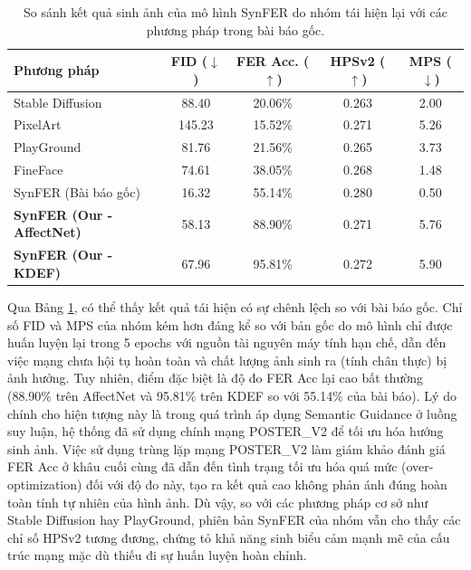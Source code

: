 \begin{table}[htbp]
    \caption{So sánh kết quả sinh ảnh của mô hình SynFER do nhóm tái hiện lại với các phương pháp trong bài báo gốc.}
    \label{tab:exp_results}
    \centering
    \begin{tabular}{lcccc}
        \toprule
        \textbf{Phương pháp}              & \textbf{FID} ($\downarrow$) & \textbf{FER Acc.} ($\uparrow$) & \textbf{HPSv2} ($\uparrow$) & \textbf{MPS} ($\downarrow$) \\
        \midrule
        Stable Diffusion                  & 88.40                       & 20.06\%                        & 0.263                       & 2.00                        \\
        PixelArt                          & 145.23                      & 15.52\%                        & 0.271                       & 5.26                        \\
        PlayGround                        & 81.76                       & 21.56\%                        & 0.265                       & 3.73                        \\
        FineFace                          & 74.61                       & 38.05\%                        & 0.268                       & 1.48                        \\
        SynFER (Bài báo gốc)              & 16.32                       & 55.14\%                        & 0.280                       & 0.50                        \\
        \midrule
        \textbf{SynFER (Our - AffectNet)} & 58.13                       & 88.90\%                        & 0.271                       & 5.76                        \\
        \textbf{SynFER (Our - KDEF)}      & 67.96                       & 95.81\%                        & 0.272                       & 5.90                        \\
        \bottomrule
    \end{tabular}
\end{table}

Qua Bảng \ref{tab:exp_results}, có thể thấy kết quả tái hiện có sự chênh lệch so với bài báo gốc. Chỉ số FID và MPS của nhóm kém hơn đáng kể so với bản gốc do mô hình chỉ được huấn luyện lại trong 5 epochs với nguồn tài nguyên máy tính hạn chế, dẫn đến việc mạng chưa hội tụ hoàn toàn và chất lượng ảnh sinh ra (tính chân thực) bị ảnh hưởng. Tuy nhiên, điểm đặc biệt là độ đo FER Acc lại cao bất thường (88.90\% trên AffectNet và 95.81\% trên KDEF so với 55.14\% của bài báo). Lý do chính cho hiện tượng này là trong quá trình áp dụng Semantic Guidance ở luồng suy luận, hệ thống đã sử dụng chính mạng POSTER\_V2 để tối ưu hóa hướng sinh ảnh. Việc sử dụng trùng lặp mạng POSTER\_V2 làm giám khảo đánh giá FER Acc ở khâu cuối cùng đã dẫn đến tình trạng tối ưu hóa quá mức (over-optimization) đối với độ đo này, tạo ra kết quả cao không phản ánh đúng hoàn toàn tính tự nhiên của hình ảnh. Dù vậy, so với các phương pháp cơ sở như Stable Diffusion hay PlayGround, phiên bản SynFER của nhóm vẫn cho thấy các chỉ số HPSv2 tương đương, chứng tỏ khả năng sinh biểu cảm mạnh mẽ của cấu trúc mạng mặc dù thiếu đi sự huấn luyện hoàn chỉnh.
